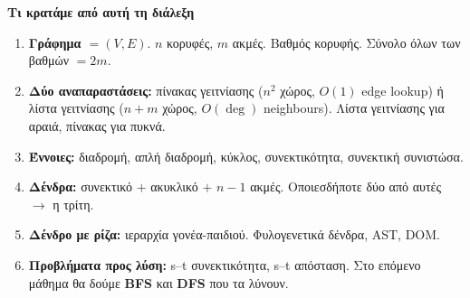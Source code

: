 \documentclass[11pt,a4paper]{article}
\begin{document}
\begin{recapbox}
\textbf{Τι κρατάμε από αυτή τη διάλεξη}
\begin{enumerate}
  \item \textbf{Γράφημα $= (V, E)$}. $n$ κορυφές, $m$ ακμές. Βαθμός κορυφής.
  Σύνολο όλων των βαθμών $= 2m$.
  \item \textbf{Δύο αναπαραστάσεις:} πίνακας γειτνίασης ($n^2$ χώρος, $O(1)$
  edge lookup) ή λίστα γειτνίασης ($n+m$ χώρος, $O(\deg)$ neighbours). Λίστα
  γειτνίασης για αραιά, πίνακας για πυκνά.
  \item \textbf{Έννοιες:} διαδρομή, απλή διαδρομή, κύκλος, συνεκτικότητα,
  συνεκτική συνιστώσα.
  \item \textbf{Δένδρα:} συνεκτικό $+$ ακυκλικό $+$ $n-1$ ακμές. Οποιεσδήποτε
  δύο από αυτές $\to$ η τρίτη.
  \item \textbf{Δένδρο με ρίζα:} ιεραρχία γονέα-παιδιού. Φυλογενετικά δένδρα,
  AST, DOM.
  \item \textbf{Προβλήματα προς λύση:} s--t συνεκτικότητα, s--t απόσταση. Στο
  επόμενο μάθημα θα δούμε \textbf{BFS} και \textbf{DFS} που τα λύνουν.
\end{enumerate}
\end{recapbox}

\lecturefooter
\end{document}
